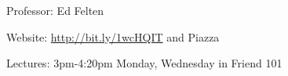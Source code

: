 Professor: Ed Felten

Website: \url{http://bit.ly/1wcHQIT} and Piazza

Lectures: 3pm-4:20pm Monday, Wednesday in Friend 101
